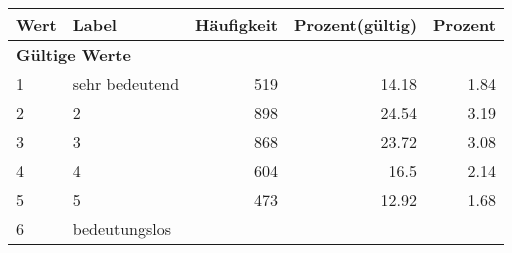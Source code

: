      \begin{longtable}{lXrrr}
     \toprule
     \textbf{Wert} & \textbf{Label} & \textbf{Häufigkeit} & \textbf{Prozent(gültig)} & \textbf{Prozent} \\
     \endhead
     \midrule
     \multicolumn{5}{l}{\textbf{Gültige Werte}}\\

     1 &
     \multicolumn{1}{X}{ sehr bedeutend   } &


       \num{519} &
       \num[round-mode=places,round-precision=2]{14,18} &
         \num[round-mode=places,round-precision=2]{1,84} \\

     2 &
     \multicolumn{1}{X}{ 2   } &


       \num{898} &
       \num[round-mode=places,round-precision=2]{24,54} &
         \num[round-mode=places,round-precision=2]{3,19} \\

     3 &
     \multicolumn{1}{X}{ 3   } &


       \num{868} &
       \num[round-mode=places,round-precision=2]{23,72} &
         \num[round-mode=places,round-precision=2]{3,08} \\

     4 &
     \multicolumn{1}{X}{ 4   } &


       \num{604} &
       \num[round-mode=places,round-precision=2]{16,5} &
         \num[round-mode=places,round-precision=2]{2,14} \\

     5 &
     \multicolumn{1}{X}{ 5   } &


       \num{473} &
       \num[round-mode=places,round-precision=2]{12,92} &
         \num[round-mode=places,round-precision=2]{1,68} \\

     6 &
     \multicolumn{1}{X}{ bedeutungslos   } &



\end{longtable}
